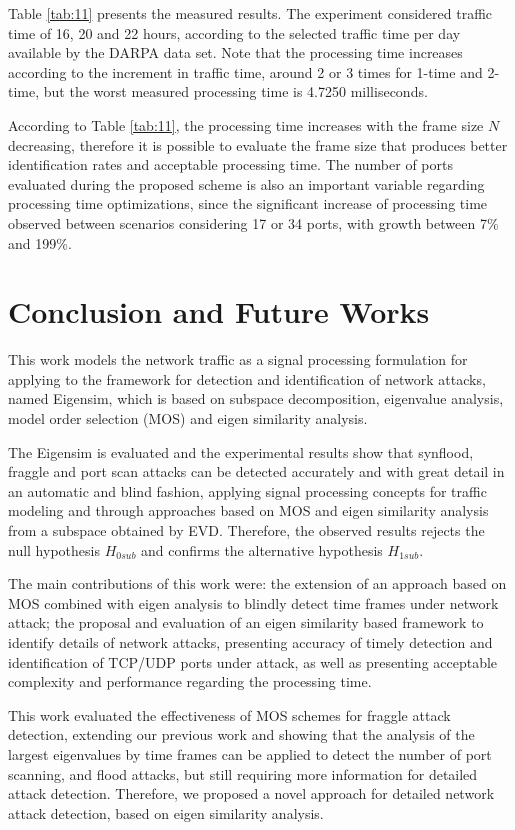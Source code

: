Table \ref{tab:11} presents the measured results. The experiment considered traffic time of 16, 20 and 22 hours, according to the selected traffic time per day available by the DARPA data set. Note that the processing time increases according to the increment in traffic time, around 2 or 3 times for 1-time and 2-time, but the worst measured processing time is 4.7250 milliseconds.

According to Table \ref{tab:11}, the processing time increases with the frame size $N$ decreasing, therefore it is possible to evaluate the frame size that produces better identification rates and acceptable processing time. The number of ports evaluated during the proposed scheme is also an important variable regarding processing time optimizations, since the significant increase of processing time observed between scenarios considering 17 or 34 ports, with growth between 7\% and 199\%.


\section{Conclusion and Future Works}
\label{sec:2_conclusionandfutureworks}

This work models the network traffic as a signal processing formulation for applying to the framework for detection and identification of network attacks, named Eigensim, which is based on subspace decomposition, eigenvalue analysis, model order selection (MOS) and eigen similarity analysis.

The Eigensim is evaluated and the experimental results show that synflood, fraggle and port scan attacks can be detected accurately and with great detail in an automatic and blind fashion, applying signal processing concepts for traffic modeling and through approaches based on MOS and eigen similarity analysis from a subspace obtained by EVD. Therefore, the observed results rejects the null hypothesis  $H_{0sub}$ and confirms the alternative
hypothesis $H_{1sub}$.

The main contributions of this work were: the extension of an approach based on MOS combined with eigen analysis to blindly detect time frames under network attack; the proposal and evaluation of an eigen similarity based framework to identify details of network attacks, presenting accuracy of timely detection and identification of TCP/UDP ports under attack, as well as presenting acceptable complexity and performance regarding the processing time.

This work evaluated the effectiveness of MOS schemes for fraggle attack detection, extending our previous work \cite{tenorio2013greatest} and showing that the analysis of the largest eigenvalues by time frames can be applied to detect the number of port scanning, and flood attacks, but still requiring more information for detailed attack detection. Therefore, we proposed a novel approach for detailed network attack detection, based on eigen similarity analysis.


